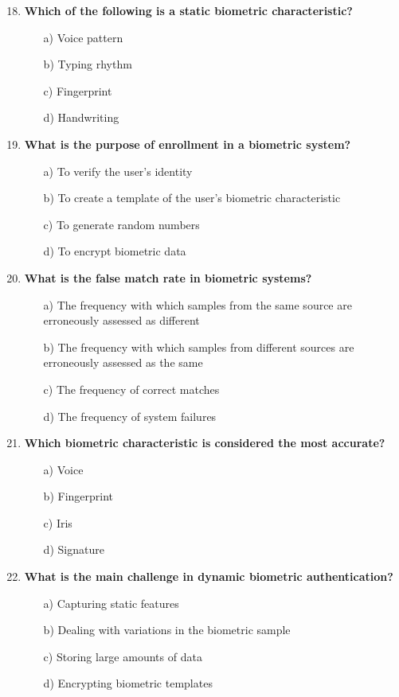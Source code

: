 \documentclass{article}
\begin{document}
\begin{enumerate}
    \setcounter{enumi}{17}
    \item \textbf{Which of the following is a static biometric characteristic?}
    \begin{itemize}
        \item[a)] Voice pattern  
        \item[b)] Typing rhythm  
        \item[c)] Fingerprint  
        \item[d)] Handwriting  
    \end{itemize}

    \item \textbf{What is the purpose of enrollment in a biometric system?}
    \begin{itemize}
        \item[a)] To verify the user’s identity  
        \item[b)] To create a template of the user’s biometric characteristic  
        \item[c)] To generate random numbers  
        \item[d)] To encrypt biometric data  
    \end{itemize}

    \item \textbf{What is the false match rate in biometric systems?}
    \begin{itemize}
        \item[a)] The frequency with which samples from the same source are erroneously assessed as different  
        \item[b)] The frequency with which samples from different sources are erroneously assessed as the same  
        \item[c)] The frequency of correct matches  
        \item[d)] The frequency of system failures  
    \end{itemize}

    \item \textbf{Which biometric characteristic is considered the most accurate?}
    \begin{itemize}
        \item[a)] Voice  
        \item[b)] Fingerprint  
        \item[c)] Iris  
        \item[d)] Signature  
    \end{itemize}

    \item \textbf{What is the main challenge in dynamic biometric authentication?}
    \begin{itemize}
        \item[a)] Capturing static features  
        \item[b)] Dealing with variations in the biometric sample  
        \item[c)] Storing large amounts of data  
        \item[d)] Encrypting biometric templates  
    \end{itemize}
\end{enumerate}
\end{document}
